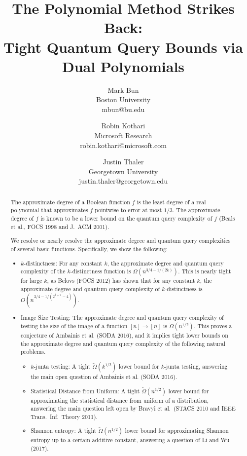 \documentclass[11pt, letterpaper, fleqn]{article}
\title{The Polynomial Method Strikes Back:\\ Tight Quantum Query Bounds via Dual Polynomials}
\author{
Mark Bun\\
Boston University\\
\textsf{mbun@bu.edu}
\and 
Robin Kothari\\
Microsoft Research\\
\textsf{robin.kothari@microsoft.com}
\and
Justin Thaler\\
Georgetown University\\
\textsf{justin.thaler@georgetown.edu}
}
\date{}
\theoremstyle{plain}
\begin{document}
\maketitle 


\begin{abstract}
The approximate degree of a Boolean function $f$ is the least degree of a real polynomial that approximates $f$ pointwise to error at most $1/3$. The approximate degree of $f$ is known to be a lower bound on the quantum query complexity of $f$ (Beals et al., FOCS 1998 and J.\ ACM 2001).

We resolve or nearly resolve the approximate degree and quantum query complexities of several basic functions. Specifically, we show the following:

\begin{itemize}
\item $k$-distinctness: For any constant $k$, the approximate degree and quantum query complexity of the $k$-distinctness function is $\Omega(n^{3/4-1/(2k)})$. 
This is nearly tight for large $k$, as Belovs (FOCS 2012) has shown that for any constant $k$, the approximate degree and quantum query complexity of $k$-distinctness is $O(n^{3/4-1/(2^{k+2}-4)})$.


\item Image Size Testing: The approximate degree and quantum query complexity of testing the size of the image of a function $[n] \to [n]$ is $\tilde{\Omega}(n^{1/2})$. This proves a conjecture of Ambainis et al. (SODA 2016), and it implies tight lower bounds on the approximate degree and quantum query complexity of the following natural problems. 
\begin{itemize} 
\item $k$-junta testing: A tight $\tilde{\Omega}(k^{1/2})$ lower bound for $k$-junta testing, answering the main open question of Ambainis et al. (SODA 2016).

\item Statistical Distance from Uniform: A tight $\tilde{\Omega}(n^{1/2})$ lower bound for approximating the statistical distance from uniform of a distribution,
answering the main question left open by Bravyi et al.\ (STACS 2010 and IEEE Trans.\ Inf.\ Theory 2011).

\item Shannon entropy: A tight $\tilde{\Omega}(n^{1/2})$ lower bound for approximating Shannon entropy up to a certain additive constant, answering a question of Li and Wu (2017). 
\end{itemize}


\end{itemize}
\end{abstract}
\end{document}
